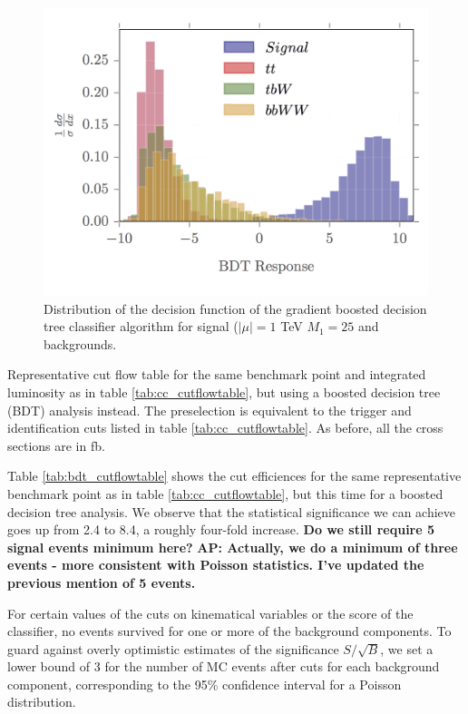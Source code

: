 \documentclass[a4paper,11pt]{article}
\newcommand{\Shufang}[1]{{\bf\color{Maroon}  #1}}
\newcommand{\Adarsh}[1]{{\bf\color{RoyalBlue} AP: #1}}
\begin{document}
\begin{figure}[h]
\centering
\includegraphics[trim = {0 0.5cm 0 0},clip]{images/bdt_response_png}
\caption{Distribution of the decision function of the gradient boosted decision
tree classifier algorithm for signal ($|\mu| = 1$ TeV $M_1 = 25$ and
backgrounds. }
\label{fig:bdt_response}
\end{figure}

\begin{table}[h]
  \centering
  
  \caption{Representative cut flow table for the same benchmark point and
    integrated luminosity as in table \ref{tab:cc_cutflowtable}, but using a
    boosted decision tree (BDT) analysis instead. The preselection is equivalent
    to the trigger and identification cuts listed in table
    \ref{tab:cc_cutflowtable}. As before, all the cross sections are in
  fb.  }
\label{tab:bdt_cutflowtable}
\end{table}

Table \ref{tab:bdt_cutflowtable} shows the cut efficiences for the same
representative benchmark point as in table \ref{tab:cc_cutflowtable}, but this
time for a boosted decision tree analysis. We observe that the statistical
significance we can achieve goes up from 2.4 to 8.4, a roughly four-fold
increase.  \Shufang{Do we still require 5 signal events minimum here?}
\Adarsh{Actually, we do a minimum of three events - more consistent with
Poisson statistics. I've updated the previous mention of 5 events.}

For certain values of the
cuts on kinematical variables or the score of the classifier, no events survived
for one or more of the background components. To guard against overly optimistic
estimates of the significance $S/\sqrt{B}$, we set a lower bound of 3 for the
number of MC events after cuts for each background component, corresponding to
the 95\% confidence interval for a Poisson distribution. 
\end{document}
